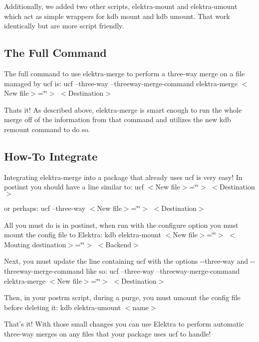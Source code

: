 Additionally, we added two other scripts, {\ttfamily elektra-\/mount} and {\ttfamily elektra-\/umount} which act as simple wrappers for {\ttfamily kdb mount} and {\ttfamily kdb umount}. That work identically but are more script friendly.

\subsection*{The Full Command}

The full command to use {\ttfamily elektra-\/merge} to perform a three-\/way merge on a file managed by ucf is\+: ucf --three-\/way --threeway-\/merge-\/command elektra-\/merge $<$\+New file$>$=\char`\"{}\char`\"{}$>$ $<$\+Destination$>$

Thats it! As described above, {\ttfamily elektra-\/merge} is smart enough to run the whole merge off of the information from that command and utilizes the new {\ttfamily kdb remount} command to do so.

\subsection*{How-\/\+To Integrate}

Integrating {\ttfamily elektra-\/merge} into a package that already uses ucf is very easy! In {\ttfamily postinst} you should have a line similar to\+: ucf $<$\+New file$>$=\char`\"{}\char`\"{}$>$ $<$\+Destination$>$

or perhaps\+: ucf --three-\/way $<$\+New file$>$=\char`\"{}\char`\"{}$>$ $<$\+Destination$>$

All you must do is in {\ttfamily postinst}, when run with the {\ttfamily configure} option you must mount the config file to Elektra\+: kdb elektra-\/mount $<$\+New file$>$=\char`\"{}\char`\"{}$>$ $<$\+Mouting destination$>$=\char`\"{}\char`\"{}$>$ $<$\+Backend$>$

Next, you must update the line containing {\ttfamily ucf} with the options {\ttfamily -\/-\/three-\/way} and {\ttfamily -\/-\/threeway-\/merge-\/command} like so\+: ucf --three-\/way --threeway-\/merge-\/command elektra-\/merge $<$\+New file$>$=\char`\"{}\char`\"{}$>$ $<$\+Destination$>$

Then, in your {\ttfamily postrm} script, during a purge, you must umount the config file before deleting it\+: kdb elektra-\/umount $<$name$>$

That's it! With those small changes you can use Elektra to perform automatic three-\/way merges on any files that your package uses ucf to handle!

